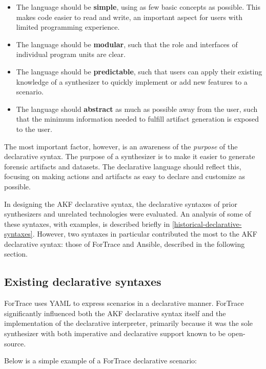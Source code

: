 \documentclass[letterpaper,12pt]{report}
\def\tightlist{}
\begin{document}
\begin{itemize}
\tightlist
\item
  The language should be \textbf{simple}, using as few basic concepts as
  possible. This makes code easier to read and write, an important
  aspect for users with limited programming experience.
\item
  The language should be \textbf{modular}, such that the role and
  interfaces of individual program units are clear.
\item
  The language should be \textbf{predictable}, such that users can apply
  their existing knowledge of a synthesizer to quickly implement or add
  new features to a scenario.
\item
  The language should \textbf{abstract} as much as possible away from
  the user, such that the minimum information needed to fulfill artifact
  generation is exposed to the user.
\end{itemize}

The most important factor, however, is an awareness of the
\emph{purpose} of the declarative syntax. The purpose of a synthesizer
is to make it easier to generate forensic artifacts and datasets. The
declarative language should reflect this, focusing on making actions and
artifacts as easy to declare and customize as possible.

In designing the AKF declarative syntax, the declarative syntaxes of
prior synthesizers and unrelated technologies were evaluated. An
analysis of some of these syntaxes, with examples, is described briefly
in \autoref{historical-declarative-syntaxes}.
However, two syntaxes in particular contributed the most to the AKF
declarative syntax: those of ForTrace and Ansible, described in the
following section.

\subsection{Existing declarative
syntaxes}\label{existing-declarative-syntaxes}

ForTrace \cite{gobelForTraceHolisticForensic2022} uses YAML to
express scenarios in a declarative manner. ForTrace significantly
influenced both the AKF declarative syntax itself and the implementation
of the declarative interpreter, primarily because it was the sole
synthesizer with both imperative and declarative support known to be
open-source.

Below is a simple example of a ForTrace declarative scenario:
\end{document}
